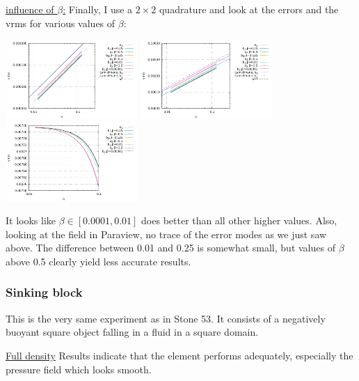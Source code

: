 \vspace{.5cm}
\underline{influence of $\beta$:} Finally, I use a $2\times 2$ quadrature and look at 
the errors and the vrms for various values of $\beta$:
\begin{center}
\includegraphics[width=5cm]{python_codes/fieldstone_72/results/mms/errors_v_beta}
\includegraphics[width=5cm]{python_codes/fieldstone_72/results/mms/errors_p_beta}
\includegraphics[width=5cm]{python_codes/fieldstone_72/results/mms/vrms_beta}
\end{center}
It looks like $\beta\in[0.0001,0.01]$ does better than all other higher values. Also, looking at the 
field in Paraview, no trace of the error modes as we just saw above.
The difference between 0.01 and 0.25 is somewhat small, but values of $\beta$ above 0.5 
clearly yield less accurate results. 












\newpage
\subsubsection*{Sinking block}
This is the very same experiment as in Stone 53. It consists of a negatively buoyant 
square object falling in a fluid in a square domain. 

\underline{Full density} 
Results indicate that the element performs adequately, especially the 
pressure field which looks smooth.  

